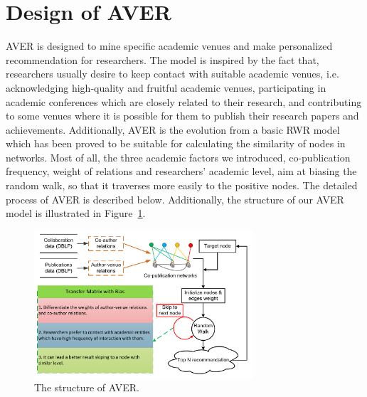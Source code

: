 \documentclass{sig-alternate-2013}
\begin{document}
\section{Design of AVER}
AVER is designed to mine specific academic venues and make personalized recommendation for researchers. The model is inspired by the fact that, researchers usually desire to keep contact with suitable academic venues, i.e. acknowledging high-quality and fruitful academic venues, participating in academic conferences which are closely related to their research, and contributing to some venues where it is possible for them to publish their research papers and achievements. Additionally, AVER is the evolution from a basic RWR model which has been proved to be suitable for calculating the similarity of nodes in networks. Most of all, the three academic factors we introduced, co-publication frequency, weight of relations and researchers' academic level, aim at biasing the random walk, so that it traverses more easily to the positive nodes. The detailed process of AVER is described below. Additionally, the structure of our AVER model is illustrated in Figure~\ref{Fig1}.
\begin{figure}[!ht]
\centering
\includegraphics [width=3.2in]{Fig1.pdf}
\caption{The structure of AVER.}
\label{Fig1}
\end{figure}
\end{document}
